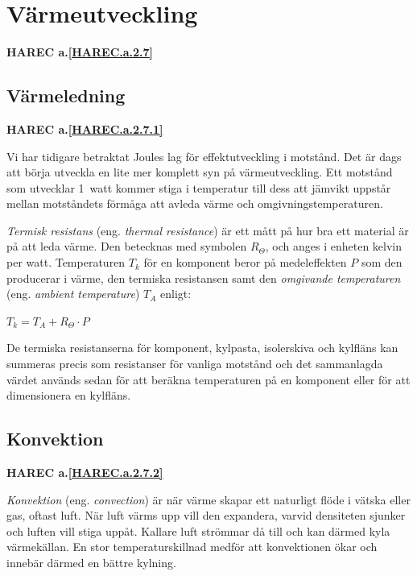 \section{Värmeutveckling}

\textbf{
HAREC a.\ref{HAREC.a.2.7}\label{myHAREC.a.2.7}
}


\subsection{Värmeledning}

\textbf{
HAREC a.\ref{HAREC.a.2.7.1}\label{myHAREC.a.2.7.1}
}


Vi har tidigare betraktat Joules lag för effektutveckling i motstånd.
Det är dags att börja utveckla en lite mer komplett syn på värmeutveckling.
Ett motstånd som utvecklar 1~watt kommer stiga i temperatur till dess att
jämvikt uppstår mellan motståndets förmåga att avleda värme och
omgivningstemperaturen.

\emph{Termisk resistans} (eng. \emph{thermal resistance}) är ett mått på
hur bra ett material är på att leda värme. Den betecknas med symbolen \(R_\Theta\),
och anges i enheten kelvin per watt.
Temperaturen \(T_k\) för en komponent beror på medeleffekten \(P\) som den
producerar i värme, den termiska resistansen samt den \emph{omgivande temperaturen}
(eng. \emph{ambient temperature}) \(T_A\) enligt:

\(T_k = T_A + R_\Theta \cdot P\)

De termiska resistanserna för komponent, kylpasta, isolerskiva och kylfläns
kan summeras precis som resistanser för vanliga motstånd och det
sammanlagda värdet används sedan för att beräkna temperaturen på en
komponent eller för att dimensionera en kylfläns.

\subsection{Konvektion}
\textbf{
HAREC a.\ref{HAREC.a.2.7.2}\label{myHAREC.a.2.7.2}
}

\emph{Konvektion} (eng. \emph{convection}) är när värme skapar ett
naturligt flöde i vätska eller gas, oftast luft. När luft värms upp 
vill den expandera, varvid densiteten sjunker och luften vill stiga uppåt.
Kallare luft strömmar då till och kan därmed kyla värmekällan. En stor
temperaturskillnad medför att konvektionen ökar och innebär därmed en bättre
kylning.

